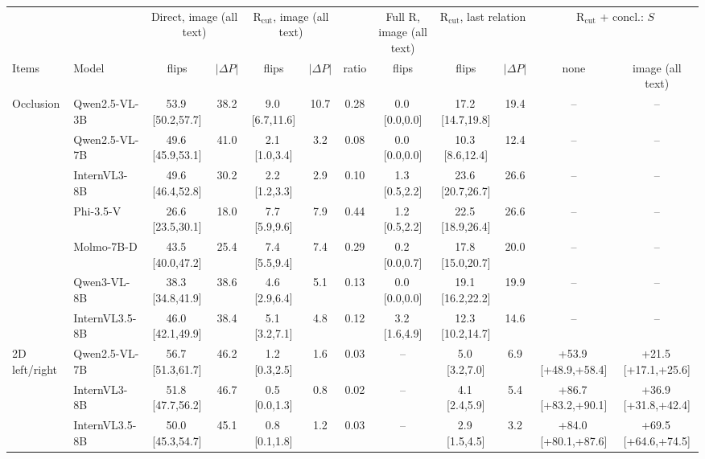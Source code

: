 \begin{tabular}{llcccccccccc}
\toprule
 & & \multicolumn{2}{c}{Direct, image (all text)} & \multicolumn{2}{c}{R$_\mathrm{cut}$, image (all text)} & & Full R, image (all text) & \multicolumn{2}{c}{R$_\mathrm{cut}$, last relation} & \multicolumn{2}{c}{R$_\mathrm{cut}$ + concl.: $S$} \\
\cmidrule(lr){3-4}\cmidrule(lr){5-6}\cmidrule(lr){8-8}\cmidrule(lr){9-10}\cmidrule(lr){11-12}
Items & Model & flips & $|\Delta P|$ & flips & $|\Delta P|$ & ratio & flips & flips & $|\Delta P|$ & none & image (all text) \\
\midrule
Occlusion & Qwen2.5-VL-3B & 53.9\,{\tiny[50.2,57.7]} & 38.2 & 9.0\,{\tiny[6.7,11.6]} & 10.7 & 0.28 & 0.0\,{\tiny[0.0,0.0]} & 17.2\,{\tiny[14.7,19.8]} & 19.4 & -- & -- \\
 & Qwen2.5-VL-7B & 49.6\,{\tiny[45.9,53.1]} & 41.0 & 2.1\,{\tiny[1.0,3.4]} & 3.2 & 0.08 & 0.0\,{\tiny[0.0,0.0]} & 10.3\,{\tiny[8.6,12.4]} & 12.4 & -- & -- \\
 & InternVL3-8B & 49.6\,{\tiny[46.4,52.8]} & 30.2 & 2.2\,{\tiny[1.2,3.3]} & 2.9 & 0.10 & 1.3\,{\tiny[0.5,2.2]} & 23.6\,{\tiny[20.7,26.7]} & 26.6 & -- & -- \\
 & Phi-3.5-V & 26.6\,{\tiny[23.5,30.1]} & 18.0 & 7.7\,{\tiny[5.9,9.6]} & 7.9 & 0.44 & 1.2\,{\tiny[0.5,2.2]} & 22.5\,{\tiny[18.9,26.4]} & 26.6 & -- & -- \\
 & Molmo-7B-D & 43.5\,{\tiny[40.0,47.2]} & 25.4 & 7.4\,{\tiny[5.5,9.4]} & 7.4 & 0.29 & 0.2\,{\tiny[0.0,0.7]} & 17.8\,{\tiny[15.0,20.7]} & 20.0 & -- & -- \\
 & Qwen3-VL-8B & 38.3\,{\tiny[34.8,41.9]} & 38.6 & 4.6\,{\tiny[2.9,6.4]} & 5.1 & 0.13 & 0.0\,{\tiny[0.0,0.0]} & 19.1\,{\tiny[16.2,22.2]} & 19.9 & -- & -- \\
 & InternVL3.5-8B & 46.0\,{\tiny[42.1,49.9]} & 38.4 & 5.1\,{\tiny[3.2,7.1]} & 4.8 & 0.12 & 3.2\,{\tiny[1.6,4.9]} & 12.3\,{\tiny[10.2,14.7]} & 14.6 & -- & -- \\
\midrule
2D left/right & Qwen2.5-VL-7B & 56.7\,{\tiny[51.3,61.7]} & 46.2 & 1.2\,{\tiny[0.3,2.5]} & 1.6 & 0.03 & -- & 5.0\,{\tiny[3.2,7.0]} & 6.9 & +53.9\,{\tiny[+48.9,+58.4]} & +21.5\,{\tiny[+17.1,+25.6]} \\
 & InternVL3-8B & 51.8\,{\tiny[47.7,56.2]} & 46.7 & 0.5\,{\tiny[0.0,1.3]} & 0.8 & 0.02 & -- & 4.1\,{\tiny[2.4,5.9]} & 5.4 & +86.7\,{\tiny[+83.2,+90.1]} & +36.9\,{\tiny[+31.8,+42.4]} \\
 & InternVL3.5-8B & 50.0\,{\tiny[45.3,54.7]} & 45.1 & 0.8\,{\tiny[0.1,1.8]} & 1.2 & 0.03 & -- & 2.9\,{\tiny[1.5,4.5]} & 3.2 & +84.0\,{\tiny[+80.1,+87.6]} & +69.5\,{\tiny[+64.6,+74.5]} \\
\bottomrule
\end{tabular}
